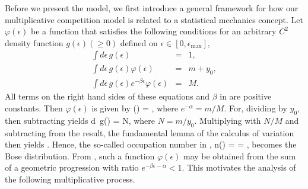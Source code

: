 \documentclass[amsmath,amssymb,floatf
ix]{revtex4}
\begin{document}
Before we present the model, we first introduce a general framework
for how our multiplicative competition model is related to a
statistical mechanics concept.
Let $\varphi(\epsilon)$ be a function that satisfies the following
conditions for an arbitrary $C^2$ density function $g(\epsilon ) (\geq 0)$
defined on $\epsilon \in [0,\epsilon_{\max}]$,
\begin{eqnarray}
\int{d\epsilon \, g(\epsilon)} &=& 1, \label{33}\\
\int{d\epsilon \, g(\epsilon)\varphi (\epsilon)} &=& m + y_0, \label{34}\\
\int{d\epsilon \, g(\epsilon)e^{- \beta \epsilon} \varphi(\epsilon)} &=& M.
\label{35}
\end{eqnarray}
All terms on the right hand sides of these equations and $\beta$ in
 are positive constants. Then $\varphi(\epsilon)$ is given
by \be\label{36} \varphi(\epsilon) = , \en where $e^{-\alpha}=m/M$. For, dividing  by
$y_0$, then subtracting  yields \be\label{24} \int
{d\epsilon \, g(\epsilon) } = N,
\en where $N = m/y_0$. Multiplying  with $ N/M$ and
subtracting  from the result,
the fundamental lemma of the calculus of variation then yields
. Hence, the so-called occupation number in ,
\be\label{37} n(\epsilon) =  =
, \en becomes the Bose
distribution. From , such a function $\varphi(\epsilon)$ may
be obtained from the sum of a geometric progression with ratio
$e^{-\beta \epsilon - \alpha}<1$. This motivates the analysis of the
following multiplicative process.
\end{document}
